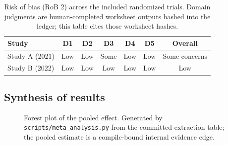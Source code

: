 \documentclass[12pt,a4paper]{article}
\begin{document}
\begin{table}[htbp]
\centering
\caption{Risk of bias (RoB 2) across the included randomized trials. Domain judgments are
human-completed worksheet outputs hashed into the ledger; this table cites those worksheet hashes.}
\label{tab:rob2}
\begin{tabular}{@{}l c c c c c c@{}}
\toprule
\textbf{Study} & \textbf{D1} & \textbf{D2} & \textbf{D3} & \textbf{D4} & \textbf{D5} & \textbf{Overall} \\
\midrule
Study A (2021) & Low  & Low  & Some & Low  & Low  & Some concerns \\
Study B (2022) & Low  & Low  & Low  & Low  & Low  & Low \\
\bottomrule
\end{tabular}
\end{table}

\subsection{Synthesis of results}
\label{sec:synthesis}

\begin{figure}[htbp]
\centering
\caption{Forest plot of the pooled effect. Generated by \texttt{scripts/meta\_analysis.py} from
the committed extraction table; the pooled estimate is a compile-bound internal evidence edge.}
\label{fig:forest}
\end{figure}
\end{document}
